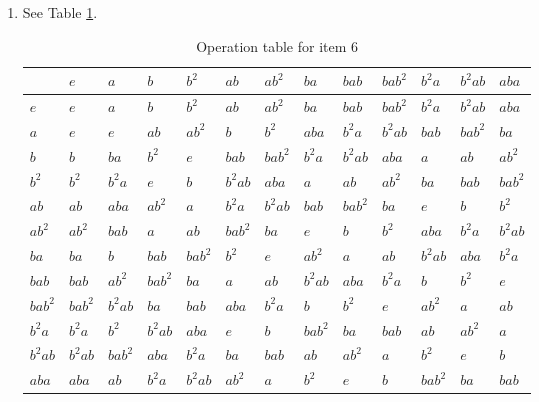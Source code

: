 \documentclass{article}
\begin{document}
\begin{enumerate}
    \item See Table \ref{tab:op-exercise-5G6}.
        \begin{table}[]
            \centering
            \begin{tabular}{l|llllllllllll}
                & $e$    & $a$    & $b$    & $b^2$  & $ab$   & $ab^2$ & $ba$   & $bab$  & $bab^2$& $b^2a$ & $b^2ab$& $aba$  \\ \hline
            $e$    & $e$    & $a$    & $b$    & $b^2$  & $ab$   & $ab^2$ & $ba$   & $bab$  & $bab^2$& $b^2a$ & $b^2ab$& $aba$  \\
            $a$    & $e$    & $e$    & $ab$   & $ab^2$ & $b$    & $b^2$  & $aba$  & $b^2a$ & $b^2ab$& $bab$  & $bab^2$& $ba$   \\
            $b$    & $b$    & $ba$   & $b^2$  & $e$    & $bab$  & $bab^2$& $b^2a$ & $b^2ab$& $aba$  & $a$    & $ab$   & $ab^2$ \\
            $b^2$  & $b^2$  & $b^2a$ & $e$    & $b$    & $b^2ab$& $aba$  & $a$    & $ab$   & $ab^2$ & $ba$   & $bab$  & $bab^2$\\
            $ab$   & $ab$   & $aba$  & $ab^2$ & $a$    & $b^2a$ & $b^2ab$& $bab$  & $bab^2$& $ba$   & $e$    & $b$    & $b^2$  \\
            $ab^2$ & $ab^2$ & $bab$  & $a$    & $ab$   & $bab^2$& $ba$   & $e$    & $b$    & $b^2$  & $aba$  & $b^2a$ & $b^2ab$\\
            $ba$   & $ba$   & $b$    & $bab$  & $bab^2$& $b^2$  & $e$    & $ab^2$ & $a$    & $ab$   & $b^2ab$& $aba$  & $b^2a$ \\
            $bab$  & $bab$  & $ab^2$ & $bab^2$& $ba$   & $a$    & $ab$   & $b^2ab$& $aba$  & $b^2a$ & $b$    & $b^2$  & $e$    \\
            $bab^2$& $bab^2$& $b^2ab$& $ba$   & $bab$  & $aba$  & $b^2a$ & $b$    & $b^2$  & $e$    & $ab^2$ & $a$    & $ab$   \\
            $b^2a$ & $b^2a$ & $b^2$  & $b^2ab$& $aba$  & $e$    & $b$    & $bab^2$& $ba$   & $bab$  & $ab$   & $ab^2$ & $a$    \\
            $b^2ab$& $b^2ab$& $bab^2$& $aba$  & $b^2a$ & $ba$   & $bab$  & $ab$   & $ab^2$ & $a$    & $b^2$  & $e$    & $b$    \\
            $aba$  & $aba$  & $ab$   & $b^2a$ & $b^2ab$& $ab^2$ & $a$    & $b^2$  & $e$    & $b$    & $bab^2$& $ba$   & $bab$ 
            \end{tabular}
            \caption{Operation table for item 6}
            \label{tab:op-exercise-5G6}
        \end{table}
\end{enumerate}
\end{document}
